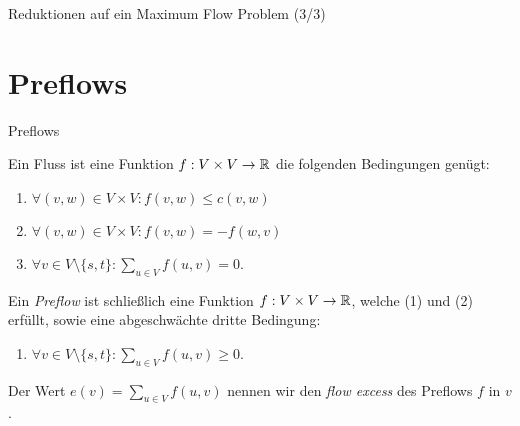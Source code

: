 \documentclass[aspectratio=169]{beamer}
\begin{document}
\begin{frame}{Reduktionen auf ein Maximum Flow Problem  (3/3)}
\begin{problem}
\begin{figure}
{
    }
    
    \end{figure}
  \end{problem} 
\end{frame}

\section{Preflows}

\begin{frame}{Preflows}

  \begin{definition}[Fluss]

    Ein Fluss ist eine Funktion $f: V \times V \to \mathbb{R}$ die folgenden Bedingungen genügt:

    \begin{enumerate}
      \item[(1)] $\forall (v,w) \in V \times V: f(v,w) \leq c(v,w)$
      \item[(2)] $\forall (v,w) \in V \times V: f(v,w) = -f(w,v)$
      \item[(3)] $\forall v \in V \setminus \{s, t\}: \sum_{u \in V} f(u, v) = 0$.
    \end{enumerate}
    
  \end{definition}
  
  
  \begin{definition}[Preflow]

    Ein \textit{Preflow} ist schließlich eine Funktion $f: V \times V \to \mathbb{R}$,
    welche (1) und (2) erfüllt, sowie eine abgeschwächte dritte Bedingung:

    \begin{enumerate}
      \item[(3')] $\forall v \in V \setminus \{s, t\}: \sum_{u \in V} f(u, v) \geq 0$.
    \end{enumerate}

    Der Wert $e(v) = \sum_{u \in V} f(u,v)$ nennen wir den \textit{flow excess}
    des Preflows $f$ in $v$.
    
  \end{definition}
  

\end{frame}
\end{document}
